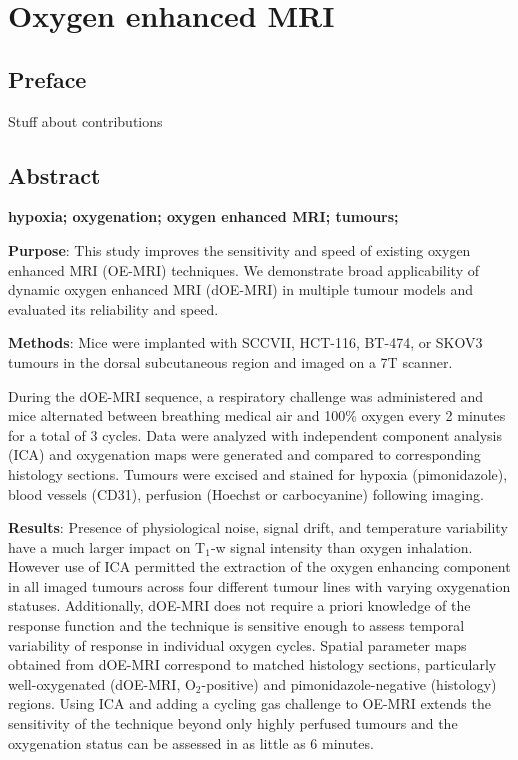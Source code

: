 
\chapter{Oxygen enhanced MRI}
\label{ch:oemri}

\section{Preface}

Stuff about contributions 

\section{Abstract}
\textbf{hypoxia; oxygenation; oxygen enhanced MRI; tumours; } %

\textbf{Purpose}: This study improves the sensitivity and speed of existing oxygen enhanced MRI (OE-MRI) techniques.
We demonstrate broad applicability of dynamic oxygen enhanced MRI (dOE-MRI) in multiple tumour models and evaluated its reliability and speed.

\noindent\textbf{Methods}: Mice were implanted with SCCVII, HCT-116, BT-474, or SKOV3 tumours in the dorsal subcutaneous region and imaged on a 7T scanner.

During the dOE-MRI sequence, a respiratory challenge was administered and mice alternated between breathing medical air and 100\% oxygen every 2 minutes for a total of 3 cycles.
Data were analyzed with independent component analysis (ICA) and oxygenation maps were generated and compared to corresponding histology sections.
Tumours were excised and stained for hypoxia (pimonidazole), blood vessels (CD31), perfusion (Hoechst or carbocyanine) following imaging.

\noindent\textbf{Results}: Presence of physiological noise, signal drift, and temperature variability have a much larger impact on T$_1$-w signal intensity than oxygen inhalation.
However use of ICA permitted the extraction of the oxygen enhancing component in all imaged tumours across four different tumour lines with varying oxygenation statuses.
Additionally, dOE-MRI does not require a priori knowledge of the response function and the technique is sensitive enough to assess temporal variability of response in individual oxygen cycles.
Spatial parameter maps obtained from dOE-MRI correspond to matched histology sections, particularly well-oxygenated (dOE-MRI, O$_2$-positive) and pimonidazole-negative (histology) regions.
Using ICA and adding a cycling gas challenge to OE-MRI extends the sensitivity of the technique beyond only highly perfused tumours and the oxygenation status can be assessed in as little as 6 minutes.


